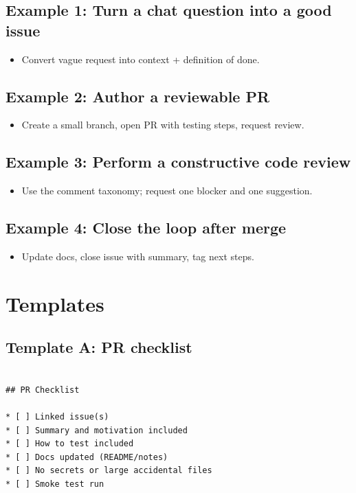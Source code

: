 \subsection{Example 1: Turn a chat question into a good issue}
\begin{itemize}
\item Convert vague request into context + definition of done.
\end{itemize}

\subsection{Example 2: Author a reviewable PR}
\begin{itemize}
\item Create a small branch, open PR with testing steps, request review.
\end{itemize}

\subsection{Example 3: Perform a constructive code review}
\begin{itemize}
\item Use the comment taxonomy; request one blocker and one suggestion.
\end{itemize}

\subsection{Example 4: Close the loop after merge}
\begin{itemize}
\item Update docs, close issue with summary, tag next steps.
\end{itemize}

\section{Templates}
\subsection{Template A: PR checklist}
\begin{verbatim}

## PR Checklist

* [ ] Linked issue(s)
* [ ] Summary and motivation included
* [ ] How to test included
* [ ] Docs updated (README/notes)
* [ ] No secrets or large accidental files
* [ ] Smoke test run
  \end{verbatim}


